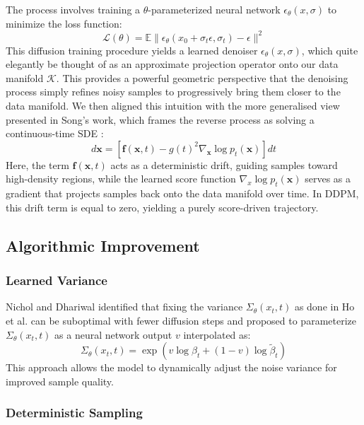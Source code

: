 \documentclass[conference]{IEEEtran}
\begin{document}
The process involves training a $\theta$-parameterized neural network $\epsilon_{\theta}(x,\sigma)$ to minimize the loss function:
$$
\mathcal{L}(\theta) = \mathbb{E}\|\epsilon_\theta(x_0 + \sigma_t\epsilon, \sigma_t) - \epsilon\|^2
$$
This diffusion training procedure yields a learned denoiser $\epsilon_{\theta}(x,\sigma)$, which quite elegantly be thought of as an approximate projection operator onto our data manifold $\mathcal{K}$. This provides a powerful geometric perspective that the denoising process simply refines noisy samples to progressively bring them closer to the data manifold. We then aligned this intuition with the more generalised view presented in Song’s work, which frames the reverse process as solving a continuous-time SDE \cite{songScoreBasedGenerativeModeling2021}:
$$
d\mathbf{x} = \left[ \mathbf{f}(\mathbf{x}, t) - g(t)^2 \nabla_\mathbf{x} \log p_t(\mathbf{x}) \right] dt
$$
Here, the term $\mathbf{f}(\mathbf{x},t)$ acts as a deterministic drift, guiding samples toward high-density regions, while the learned score function $\nabla_x \log p_t(\mathbf{x})$ serves as a gradient that projects samples back onto the data manifold over time. In DDPM, this drift term is equal to zero, yielding a purely score-driven trajectory.

\subsection{Algorithmic Improvement}\label{algorithmic_improvement}
\subsubsection{Learned Variance}\label{learned_variance}

Nichol and Dhariwal \cite{dhariwalDiffusionModelsBeat2021} identified that fixing the variance $\Sigma_\theta(x_t, t)$ as done in Ho et al. \cite{hoDenoisingDiffusionProbabilistic2020} can be suboptimal with fewer diffusion steps and proposed to parameterize $\Sigma_\theta(x_t, t)$ as a neural network output $v$ interpolated as:
$$
\Sigma_\theta(x_t, t) = \exp \left(v \log \beta_t + (1 - v) \log \tilde{\beta}_t \right)
$$
This approach allows the model to dynamically adjust the noise variance for improved sample quality.

\subsubsection{Deterministic Sampling}\label{deterministic_sampling}
\end{document}
